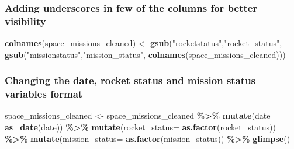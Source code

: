 \documentclass[
]{article}
\newenvironment{Shaded}{\begin{snugshade}}{\end{snugshade}}
\newcommand{\AttributeTok}[1]{\textcolor[rgb]{0.13,0.29,0.53}{#1}}
\newcommand{\FunctionTok}[1]{\textcolor[rgb]{0.13,0.29,0.53}{\textbf{#1}}}
\newcommand{\NormalTok}[1]{#1}
\newcommand{\OtherTok}[1]{\textcolor[rgb]{0.56,0.35,0.01}{#1}}
\newcommand{\SpecialCharTok}[1]{\textcolor[rgb]{0.81,0.36,0.00}{\textbf{#1}}}
\newcommand{\StringTok}[1]{\textcolor[rgb]{0.31,0.60,0.02}{#1}}
\begin{document}
\hypertarget{adding-underscores-in-few-of-the-columns-for-better-visibility}{%
\subsubsection{Adding underscores in few of the columns for better
visibility}\label{adding-underscores-in-few-of-the-columns-for-better-visibility}}

\begin{Shaded}
\begin{Highlighting}[]
\FunctionTok{colnames}\NormalTok{(space\_missions\_cleaned) }\OtherTok{\textless{}{-}} \FunctionTok{gsub}\NormalTok{(}\StringTok{"rocketstatus"}\NormalTok{,}\StringTok{"rocket\_status"}\NormalTok{,}
                                         \FunctionTok{gsub}\NormalTok{(}\StringTok{"missionstatus"}\NormalTok{,}\StringTok{"mission\_status"}\NormalTok{,}
                                              \FunctionTok{colnames}\NormalTok{(space\_missions\_cleaned)))}
\end{Highlighting}
\end{Shaded}

\hypertarget{changing-the-date-rocket-status-and-mission-status-variables-format}{%
\subsubsection{Changing the date, rocket status and mission status
variables
format}\label{changing-the-date-rocket-status-and-mission-status-variables-format}}

\begin{Shaded}
\begin{Highlighting}[]
\NormalTok{space\_missions\_cleaned }\OtherTok{\textless{}{-}}\NormalTok{ space\_missions\_cleaned }\SpecialCharTok{\%\textgreater{}\%} 
  \FunctionTok{mutate}\NormalTok{(}\AttributeTok{date =} \FunctionTok{as\_date}\NormalTok{(date)) }\SpecialCharTok{\%\textgreater{}\%} 
  \FunctionTok{mutate}\NormalTok{(}\AttributeTok{rocket\_status=} \FunctionTok{as.factor}\NormalTok{(rocket\_status)) }\SpecialCharTok{\%\textgreater{}\%} 
  \FunctionTok{mutate}\NormalTok{(}\AttributeTok{mission\_status=} \FunctionTok{as.factor}\NormalTok{(mission\_status)) }\SpecialCharTok{\%\textgreater{}\%} 
  \FunctionTok{glimpse}\NormalTok{()}
\end{Highlighting}
\end{Shaded}
\end{document}
